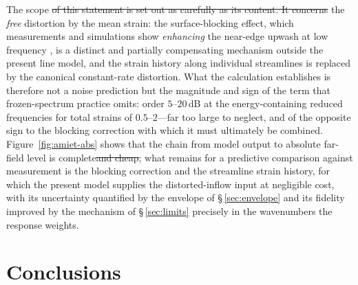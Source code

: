 \documentclass[lineno]{JFM-FLM_Au}
\providecommand{\DIFadd}[1]{{\protect\color{blue}\uwave{#1}}} %
\providecommand{\DIFdel}[1]{{\protect\color{red}\sout{#1}}} %
\providecommand{\DIFaddbegin}{} %
\providecommand{\DIFaddend}{} %
\providecommand{\DIFdelbegin}{} %
\providecommand{\DIFdelend}{} %
\begin{document}
The scope \DIFdelbegin \DIFdel{of this statement is set out as carefully as its content.
It concerns }\DIFdelend \DIFaddbegin \DIFadd{is limited to }\DIFaddend the \emph{free} distortion by the mean strain: the
surface-blocking effect, which measurements and simulations show
\emph{enhancing} the near-edge upwash at low frequency
\citep{HuntGraham1978,dosSantos2023,Piccolo2024}, is a distinct and
partially compensating mechanism outside the present line model, and
the strain history along individual streamlines is replaced by the
canonical constant-rate distortion. What the calculation establishes
is therefore not a noise prediction but the magnitude and sign of the
term that frozen-spectrum practice omits: order $5$--$20$\,dB at the
energy-containing reduced frequencies for total strains of
$0.5$--$2$---far too large to neglect, and of the opposite sign to the
blocking correction with which it must ultimately be combined.
Figure~\ref{fig:amiet-abs} shows that the chain from model output to
absolute far-field level is complete\DIFdelbegin \DIFdel{and cheap}\DIFdelend ; what remains for a
predictive comparison against measurement is the blocking correction
and the streamline strain history, for which the present model
supplies the distorted-inflow input at negligible cost, with its
uncertainty quantified by the envelope of \S\,\ref{sec:envelope} and
its fidelity improved by the mechanism of \S\,\ref{sec:limits}
precisely in the wavenumbers the response weights.

\section{Conclusions}\label{sec:conclusions}
\end{document}

